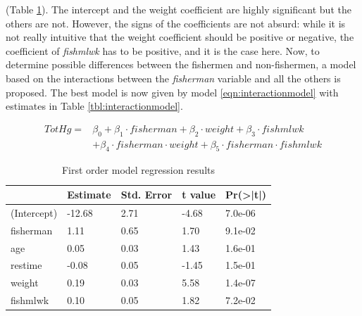 \documentclass[12pt,]{article}
\begin{document}
(Table \ref{tbl:fullmodel}). The intercept and the weight coefficient
are highly significant but the others are not. However, the signs of the
coefficients are not absurd: while it is not really intuitive that the
weight coefficient should be positive or negative, the coefficient of
\emph{fishmlwk} has to be positive, and it is the case here. Now, to
determine possible differences between the fishermen and non-fishermen,
a model based on the interactions between the \emph{fisherman} variable
and all the others is proposed. The best model is now given by model
\ref{eqn:interactionmodel} with estimates in Table
\ref{tbl:interactionmodel}.

\begin{equation}
\label{eqn:interactionmodel}
\begin{split}
TotHg = & \beta_0 + \beta_1 \cdot fisherman + \beta_2 \cdot weight +  \beta_3 \cdot fishmlwk \\&+ \beta_4 \cdot fisherman \cdot weight + \beta_5 \cdot fisherman \cdot fishmlwk
\end{split}
\end{equation}

\begin{table}[t]

\caption{\label{tab:unnamed-chunk-12}\label{tbl:fullmodel}First order model regression results}
\centering
\begin{tabular}{l|l|l|l|l}
\hline
  & Estimate & Std. Error & t value & Pr(>|t|)\\
\hline
\rowcolor{gray!6}  (Intercept) & -12.68 & 2.71 & -4.68 & 7.0e-06\\
\hline
fisherman & 1.11 & 0.65 & 1.70 & 9.1e-02\\
\hline
\rowcolor{gray!6}  age & 0.05 & 0.03 & 1.43 & 1.6e-01\\
\hline
restime & -0.08 & 0.05 & -1.45 & 1.5e-01\\
\hline
\rowcolor{gray!6}  weight & 0.19 & 0.03 & 5.58 & 1.4e-07\\
\hline
fishmlwk & 0.10 & 0.05 & 1.82 & 7.2e-02\\
\hline
\end{tabular}
\end{table}
\end{document}
